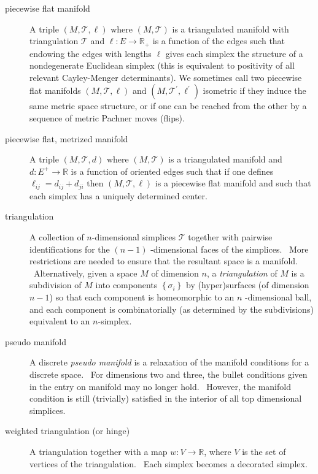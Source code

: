 \begin{description}
\item[piecewise flat manifold] A triple $\left( M,\mathcal{T},\ell \right) $
where $\left( M,\mathcal{T}\right) $ is a triangulated manifold with
triangulation $\mathcal{T}$ and $\ell :E\rightarrow \mathbb{R}_{+}$ is a
function of the edges such that endowing the edges with lengths $\ell $
gives each simplex the structure of a nondegenerate Euclidean simplex (this
is equivalent to positivity of all relevant Cayley-Menger determinants). We
sometimes call two piecewise flat manifolds $\left( M,\mathcal{T},\ell
\right) $ and $\left( M,\mathcal{T}^{\prime },\ell ^{\prime }\right) $
isometric if they induce the same metric space structure, or if one can be
reached from the other by a sequence of metric Pachner moves (flips).\ 

\item[piecewise flat, metrized manifold] A triple $\left( M,\mathcal{T}%
,d\right) $ where $\left( M,\mathcal{T}\right) $ is a triangulated manifold
and $d:E^{+}\rightarrow \mathbb{R}$ is a function of oriented edges such
that if one defines $\ell _{ij}=d_{ij}+d_{ji}$ then $\left( M,\mathcal{T}%
,\ell \right) $ is a piecewise flat manifold and such that each simplex has
a uniquely determined center.

\item[triangulation] A collection of $n$-dimensional simplices $\mathcal{T}$
together with pairwise identifications for the $\left( n-1\right) $%
-dimensional faces of the simplices. \ More restrictions are needed to
ensure that the resultant space is a manifold. \ Alternatively, given a
space $M$ of dimension $n$, a \textit{triangulation} of $M$ is a subdivision
of $M$ into components $\left\{ \sigma _{i}\right\} $ by (hyper)surfaces (of
dimension $n-1$) so that each component is homeomorphic to an $n$%
-dimensional ball, and each component is combinatorially (as determined by
the subdivisions) equivalent to an $n$-simplex. \ 

\item[pseudo manifold] A discrete \textit{pseudo manifold} is a relaxation
of the manifold conditions for a discrete space. \ For dimensions two and
three, the bullet conditions given in the entry on manifold may no longer
hold. \ However, the manifold condition is still (trivially) satisfied in
the interior of all top dimensional simplices.

\item[weighted triangulation (or hinge)] A triangulation together with a map 
$w:V\rightarrow 
\mathbb{R}
$, where $V$ is the set of vertices of the triangulation. \ Each simplex
becomes a decorated simplex. \ 


\end{description}
